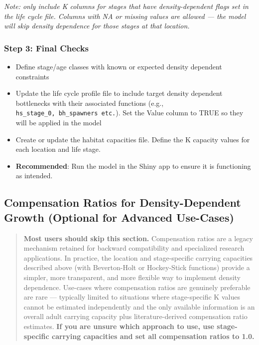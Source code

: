 \documentclass[
  letterpaper,
  DIV=11,
  numbers=noendperiod]{scrreprt}
\begin{document}
\emph{Note: only include K columns for stages that have
density-dependent flags set in the life cycle file. Columns with NA or
missing values are allowed --- the model will skip density dependence
for those stages at that location.}

\subsubsection{Step 3: Final Checks}\label{step-3-final-checks}

\begin{itemize}
\item
  Define stage/age classes with known or expected density dependent
  constraints
\item
  Update the life cycle profile file to include target density dependent
  bottlenecks with their associated functions (e.g.,
  \texttt{hs\_stage\_0,\ bh\_spawners\ etc.}). Set the Value column to
  TRUE so they will be applied in the model
\item
  Create or update the habitat capacities file. Define the K capacity
  values for each location and life stage.
\item
  \textbf{Recommended}: Run the model in the Shiny app to ensure it is
  functioning as intended.
\end{itemize}

\subsection{Compensation Ratios for Density-Dependent Growth (Optional
for Advanced
Use-Cases)}\label{compensation-ratios-for-density-dependent-growth-optional-for-advanced-use-cases}

\begin{quote}
\textbf{Most users should skip this section.} Compensation ratios are a
legacy mechanism retained for backward compatibility and specialized
research applications. In practice, the location and stage-specific
carrying capacities described above (with Beverton-Holt or Hockey-Stick
functions) provide a simpler, more transparent, and more flexible way to
implement density dependence. Use-cases where compensation ratios are
genuinely preferable are rare --- typically limited to situations where
stage-specific K values cannot be estimated independently and the only
available information is an overall adult carrying capacity plus
literature-derived compensation ratio estimates. \textbf{If you are
unsure which approach to use, use stage-specific carrying capacities and
set all compensation ratios to 1.0.}
\end{quote}
\end{document}
